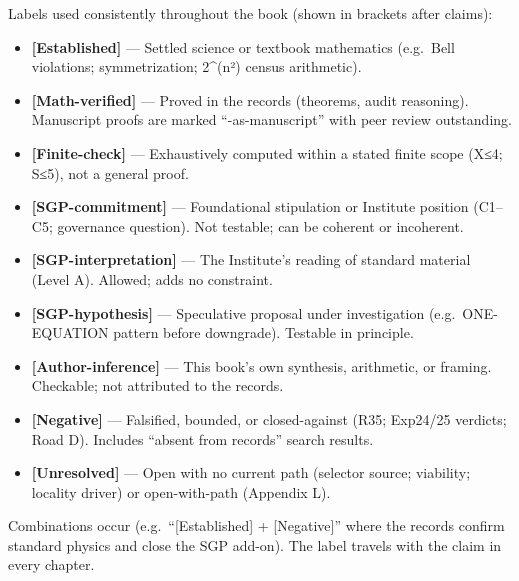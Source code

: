 \documentclass[
  11pt,
]{book}
\providecommand{\tightlist}{%
  \setlength{\itemsep}{0pt}\setlength{\parskip}{0pt}}
\begin{document}
Labels used consistently throughout the book (shown in brackets after
claims):

\begin{itemize}
\tightlist
\item
  \textbf{{[}Established{]}} --- Settled science or textbook mathematics
  (e.g.~Bell violations; symmetrization; 2\^{}(n²) census arithmetic).
\item
  \textbf{{[}Math-verified{]}} --- Proved in the records (theorems,
  audit reasoning). Manuscript proofs are marked ``-as-manuscript'' with
  peer review outstanding.
\item
  \textbf{{[}Finite-check{]}} --- Exhaustively computed within a stated
  finite scope (\textbar X\textbar≤4; \textbar S\textbar≤5), not a
  general proof.
\item
  \textbf{{[}SGP-commitment{]}} --- Foundational stipulation or
  Institute position (C1--C5; governance question). Not testable; can be
  coherent or incoherent.
\item
  \textbf{{[}SGP-interpretation{]}} --- The Institute's reading of
  standard material (Level A). Allowed; adds no constraint.
\item
  \textbf{{[}SGP-hypothesis{]}} --- Speculative proposal under
  investigation (e.g.~ONE-EQUATION pattern before downgrade). Testable
  in principle.
\item
  \textbf{{[}Author-inference{]}} --- This book's own synthesis,
  arithmetic, or framing. Checkable; not attributed to the records.
\item
  \textbf{{[}Negative{]}} --- Falsified, bounded, or closed-against
  (R35; Exp24/25 verdicts; Road D). Includes ``absent from records''
  search results.
\item
  \textbf{{[}Unresolved{]}} --- Open with no current path (selector
  source; viability; locality driver) or open-with-path (Appendix L).
\end{itemize}

Combinations occur (e.g.~``{[}Established{]} + {[}Negative{]}'' where
the records confirm standard physics and close the SGP add-on). The
label travels with the claim in every chapter.

\backmatter
\end{document}
